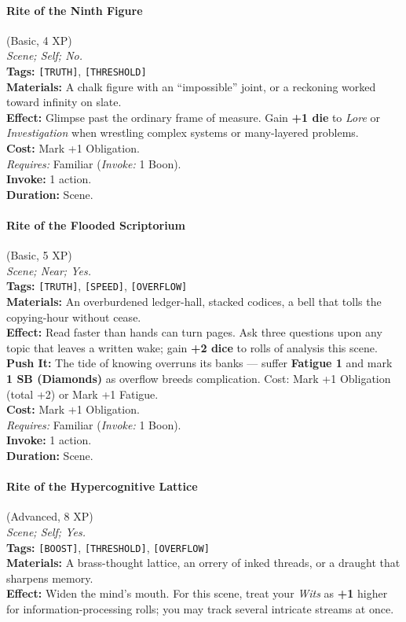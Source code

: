 \paragraph{Rite of the Ninth Figure} (Basic, 4 XP) \hfill \\
\emph{Scene; Self; No.} \\
\textbf{Tags:} \texttt{[TRUTH]}, \texttt{[THRESHOLD]} \\
\textbf{Materials:} A chalk figure with an ``impossible'' joint, or a reckoning worked toward infinity on slate. \\
\textbf{Effect:} Glimpse past the ordinary frame of measure. Gain \textbf{+1 die} to \textit{Lore} or \textit{Investigation} when wrestling complex systems or many-layered problems. \\
\textbf{Cost:} Mark +1 Obligation. \\
\textit{Requires:} Familiar (\textit{Invoke:} 1 Boon). \\
\textbf{Invoke:} 1 action. \\
\textbf{Duration:} Scene.

\paragraph{Rite of the Flooded Scriptorium} (Basic, 5 XP) \hfill \\
\emph{Scene; Near; Yes.} \\
\textbf{Tags:} \texttt{[TRUTH]}, \texttt{[SPEED]}, \texttt{[OVERFLOW]} \\
\textbf{Materials:} An overburdened ledger-hall, stacked codices, a bell that tolls the copying-hour without cease. \\
\textbf{Effect:} Read faster than hands can turn pages. Ask three questions upon any topic that leaves a written wake; gain \textbf{+2 dice} to rolls of analysis this scene. \\
\textbf{Push It:} The tide of knowing overruns its banks --- suffer \textbf{Fatigue 1} and mark \textbf{1 SB (Diamonds)} as overflow breeds complication. Cost: Mark +1 Obligation (total +2) or Mark +1 Fatigue. \\
\textbf{Cost:} Mark +1 Obligation. \\
\textit{Requires:} Familiar (\textit{Invoke:} 1 Boon). \\
\textbf{Invoke:} 1 action. \\
\textbf{Duration:} Scene.

\paragraph{Rite of the Hypercognitive Lattice} (Advanced, 8 XP) \hfill \\
\emph{Scene; Self; Yes.} \\
\textbf{Tags:} \texttt{[BOOST]}, \texttt{[THRESHOLD]}, \texttt{[OVERFLOW]} \\
\textbf{Materials:} A brass-thought lattice, an orrery of inked threads, or a draught that sharpens memory. \\
\textbf{Effect:} Widen the mind's mouth. For this scene, treat your \textit{Wits} as \textbf{+1} higher for information-processing rolls; you may track several intricate streams at once.

